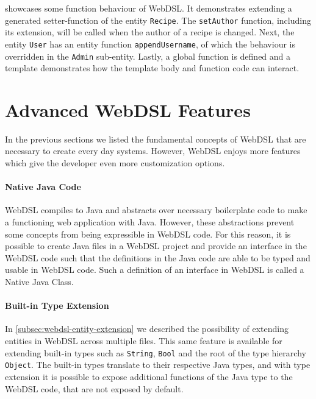      showcases some function behaviour of WebDSL. It demonstrates extending a generated setter-function of the entity \texttt{Recipe}. The \texttt{setAuthor} function, including its extension, will be called when the author of a recipe is changed. Next, the entity \texttt{User} has an entity function \texttt{appendUsername}, of which the behaviour is overridden in the \texttt{Admin} sub-entity. Lastly, a global function is defined and a template demonstrates how the template body and function code can interact.
  
  \section{\label{sec:advanced-webdsl-features}Advanced WebDSL Features}

    In the previous sections we listed the fundamental concepts of WebDSL that are necessary to create every day systems. However, WebDSL enjoys more features which give the developer even more customization options.

    \paragraph{Native Java Code} WebDSL compiles to Java and abstracts over necessary boilerplate code to make a functioning web application with Java. However, these abstractions prevent some concepts from being expressible in WebDSL code. For this reason, it is possible to create Java files in a WebDSL project and provide an interface in the WebDSL code such that the definitions in the Java code are able to be typed and usable in WebDSL code. Such a definition of an interface in WebDSL is called a Native Java Class.

    \paragraph{Built-in Type Extension} In \cref{subsec:webdsl-entity-extension} we described the possibility of extending entities in WebDSL across multiple files. This same feature is available for extending built-in types such as \texttt{String}, \texttt{Bool} and the root of the type hierarchy \texttt{Object}. The built-in types translate to their respective Java types, and with type extension it is possible to expose additional functions of the Java type to the WebDSL code, that are not exposed by default.

